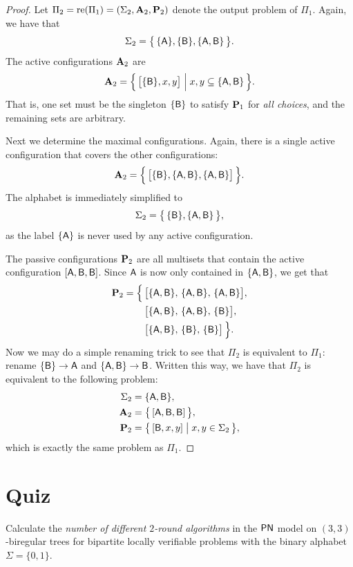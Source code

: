 \begin{proof}
	Let $\Pi_2 = \operatorname{re}(\Pi_1) = (\Sigma_2, \mathbf{A}_2, \mathbf{P}_2)$ denote the output problem of $\Pi_1$. Again, we have that 
	\[
		\Sigma_2 = \bigl\{ \, \{ \mathsf{A} \}, \{ \mathsf{B} \}, \{ \mathsf{A}, \mathsf{B} \} \, \bigl\}.
	\]
	The active configurations $\mathbf{A}_2$ are
	\[
		\mathbf{A}_2 = \Bigl\{\, \bigl[ \{ \mathsf{B} \}, x, y \bigr] \Bigm| x,y \subseteq \{ \mathsf{A}, \mathsf{B} \}\,  \Bigl\}. 
	\]
	That is, one set must be the singleton $\{ \mathsf{B} \}$ to satisfy $\mathbf{P}_1$ for \emph{all choices}, and the remaining sets are arbitrary.
	
	Next we determine the maximal configurations. Again, there is a single active configuration that covers the other configurations:
	\[
		\mathbf{A}_2 = \Bigl\{\,  \bigl[\{\mathsf{B} \}, \{ \mathsf{A},\mathsf{B}\}, \{\mathsf{A}, \mathsf{B} \}\bigr]\,  \Bigr\}. 
	\]
	The alphabet is immediately simplified to
	\[
		\Sigma_2 = \bigl\{\, \{\mathsf{B} \}, \{\mathsf{A}, \mathsf{B} \} \,\bigr\},
	\]
	as the label $\{\mathsf{A} \}$ is never used by any active configuration.
	
	The passive configurations $\mathbf{P}_2$ are all multisets that contain the active configuration $[\mathsf{A}, \mathsf{B}, \mathsf{B}]$. Since $\mathsf{A}$ is now only contained in $\{ \mathsf{A}, \mathsf{B} \}$, we get that
	\begin{align*}
		\mathbf{P}_2 = \Bigl\{\,
		&\bigl[\{ \mathsf{A}, \mathsf{B} \},\, \{ \mathsf{A}, \mathsf{B} \},\, \{ \mathsf{A}, \mathsf{B} \}\bigr], \\
		&\bigl[\{ \mathsf{A}, \mathsf{B} \},\, \{ \mathsf{A}, \mathsf{B} \},\, \{ \mathsf{B} \}\bigr], \\
		&\bigl[\{ \mathsf{A}, \mathsf{B} \},\, \{ \mathsf{B} \},\, \{ \mathsf{B} \}\bigr] \, \Bigr\}.
	\end{align*}
	Now we may do a simple renaming trick to see that $\Pi_2$ is equivalent to $\Pi_1$: rename $\{ \mathsf{B} \} \to \mathsf{A}$ and $\{\mathsf{A},\mathsf{B}\} \to \mathsf{B}$. Written this way, we have that $\Pi_2$ is equivalent to the following problem:
	\begin{align*}
		\Sigma_2 &= \{ \mathsf{A}, \mathsf{B} \}, \\
		\mathbf{A}_2 &= \bigl\{\,  [\mathsf{A}, \mathsf{B}, \mathsf{B} ] \,\bigr\}, \\
		\mathbf{P}_2 &= \bigl\{\,  [\mathsf{B}, x, y] \bigm| x,y \in \Sigma_2 \,\bigr\},
	\end{align*}
	which is exactly the same problem as $\Pi_1$.
\end{proof}

\section{Quiz}

Calculate the \emph{number of different $2$-round algorithms} in the $\textup{\sffamily PN}$ model on $(3,3)$-biregular trees for bipartite locally verifiable problems with the binary alphabet $\Sigma = \{0,1\}$.

